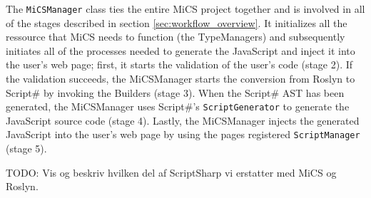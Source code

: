 The \texttt{MiCSManager} class ties the entire MiCS project together and is involved in all of the stages described in section \ref{sec:workflow_overview}. It initializes all the ressource that MiCS needs to function (the TypeManagers) and subsequently initiates all of the processes needed to generate the JavaScript and inject it into the user's web page; first, it starts the validation of the user's code (stage 2). If the validation succeeds, the MiCSManager starts the conversion from Roslyn to Script\# by invoking the Builders (stage 3). When the Script\# AST has been generated, the MiCSManager uses Script\#'s \texttt{ScriptGenerator} to generate the JavaScript source code (stage 4). Lastly, the MiCSManager injects the generated JavaScript into the user's web page by using the pages registered \texttt{ScriptManager} (stage 5). 

TODO: Vis og beskriv hvilken del af ScriptSharp vi erstatter med MiCS og Roslyn.

